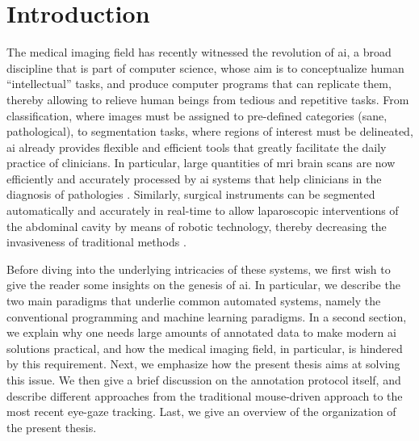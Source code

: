 \glsresetall

\chapter{Introduction}
\label{intro}

The medical imaging field has recently witnessed the revolution of \gls{ai}, a broad discipline that is part of computer science, whose aim is to conceptualize human ``intellectual'' tasks, and produce computer programs that can replicate them, thereby allowing to relieve human beings from tedious and repetitive tasks.
From classification, where images must be assigned to pre-defined categories (sane, pathological), to segmentation tasks, where regions of interest must be delineated, \gls{ai} already provides flexible and efficient tools that greatly facilitate the daily practice of clinicians.
In particular, large quantities of \gls{mri} brain scans are now efficiently and accurately processed by \gls{ai} systems that help clinicians in the diagnosis of pathologies \cite{sun19}.
Similarly, surgical instruments can be segmented automatically and accurately in real-time to allow laparoscopic interventions of the abdominal cavity by means of robotic technology, thereby decreasing the invasiveness of traditional methods \cite{davinci}.

Before diving into the underlying intricacies of these systems, we
first wish to give the reader some insights on the genesis of \gls{ai}.
In particular, we describe the two main paradigms that underlie common automated systems, namely the conventional programming and machine learning paradigms.
In a second section, we explain why one needs large amounts of annotated data to make modern \gls{ai} solutions practical, and how the medical imaging field, in particular, is hindered by this requirement.
Next, we emphasize how the present thesis aims at solving this issue.
We then give a brief discussion on the annotation protocol itself, and describe different approaches
from the traditional mouse-driven approach to the most recent eye-gaze tracking.
Last, we give an overview of the organization of the present thesis.

